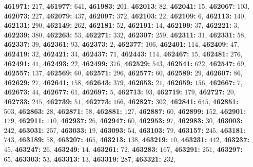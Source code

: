 \textsf{\bfseries 461971:} $217$, \textsf{\bfseries 461977:} $641$, \textsf{\bfseries 461983:} $201$, \textsf{\bfseries 462013:} $82$, \textsf{\bfseries 462041:} $15$, \textsf{\bfseries 462067:} $103$, \textsf{\bfseries 462073:} $227$, \textsf{\bfseries 462079:} $437$, \textsf{\bfseries 462097:} $372$, \textsf{\bfseries 462103:} $22$, \textsf{\bfseries 462109:} $6$, \textsf{\bfseries 462113:} $140$, \textsf{\bfseries 462131:} $290$, \textsf{\bfseries 462149:} $262$, \textsf{\bfseries 462181:} $52$, \textsf{\bfseries 462191:} $14$, \textsf{\bfseries 462199:} $37$, \textsf{\bfseries 462221:} $3$, \textsf{\bfseries 462239:} $380$, \textsf{\bfseries 462263:} $53$, \textsf{\bfseries 462271:} $332$, \textsf{\bfseries 462307:} $259$, \textsf{\bfseries 462311:} $31$, \textsf{\bfseries 462331:} $58$, \textsf{\bfseries 462337:} $39$, \textsf{\bfseries 462361:} $93$, \textsf{\bfseries 462373:} $2$, \textsf{\bfseries 462377:} $106$, \textsf{\bfseries 462401:} $114$, \textsf{\bfseries 462409:} $47$, \textsf{\bfseries 462419:} $32$, \textsf{\bfseries 462421:} $34$, \textsf{\bfseries 462437:} $71$, \textsf{\bfseries 462443:} $114$, \textsf{\bfseries 462467:} $15$, \textsf{\bfseries 462481:} $276$, \textsf{\bfseries 462491:} $41$, \textsf{\bfseries 462493:} $22$, \textsf{\bfseries 462499:} $376$, \textsf{\bfseries 462529:} $543$, \textsf{\bfseries 462541:} $622$, \textsf{\bfseries 462547:} $69$, \textsf{\bfseries 462557:} $137$, \textsf{\bfseries 462569:} $60$, \textsf{\bfseries 462571:} $296$, \textsf{\bfseries 462577:} $60$, \textsf{\bfseries 462589:} $29$, \textsf{\bfseries 462607:} $86$, \textsf{\bfseries 462629:} $27$, \textsf{\bfseries 462641:} $158$, \textsf{\bfseries 462643:} $379$, \textsf{\bfseries 462653:} $21$, \textsf{\bfseries 462659:} $156$, \textsf{\bfseries 462667:} $7$, \textsf{\bfseries 462673:} $44$, \textsf{\bfseries 462677:} $61$, \textsf{\bfseries 462697:} $5$, \textsf{\bfseries 462713:} $93$, \textsf{\bfseries 462719:} $179$, \textsf{\bfseries 462727:} $20$, \textsf{\bfseries 462733:} $245$, \textsf{\bfseries 462739:} $51$, \textsf{\bfseries 462773:} $166$, \textsf{\bfseries 462827:} $302$, \textsf{\bfseries 462841:} $645$, \textsf{\bfseries 462851:} $503$, \textsf{\bfseries 462863:} $28$, \textsf{\bfseries 462871:} $58$, \textsf{\bfseries 462881:} $127$, \textsf{\bfseries 462887:} $60$, \textsf{\bfseries 462899:} $152$, \textsf{\bfseries 462901:} $179$, \textsf{\bfseries 462911:} $110$, \textsf{\bfseries 462937:} $26$, \textsf{\bfseries 462947:} $60$, \textsf{\bfseries 462953:} $97$, \textsf{\bfseries 462983:} $30$, \textsf{\bfseries 463003:} $242$, \textsf{\bfseries 463031:} $257$, \textsf{\bfseries 463033:} $19$, \textsf{\bfseries 463093:} $54$, \textsf{\bfseries 463103:} $79$, \textsf{\bfseries 463157:} $245$, \textsf{\bfseries 463181:} $743$, \textsf{\bfseries 463189:} $58$, \textsf{\bfseries 463207:} $465$, \textsf{\bfseries 463213:} $138$, \textsf{\bfseries 463219:} $10$, \textsf{\bfseries 463231:} $442$, \textsf{\bfseries 463237:} $45$, \textsf{\bfseries 463247:} $26$, \textsf{\bfseries 463249:} $14$, \textsf{\bfseries 463261:} $72$, \textsf{\bfseries 463283:} $167$, \textsf{\bfseries 463291:} $251$, \textsf{\bfseries 463297:} $65$, \textsf{\bfseries 463303:} $53$, \textsf{\bfseries 463313:} $13$, \textsf{\bfseries 463319:} $287$, \textsf{\bfseries 463321:} $232$, 

